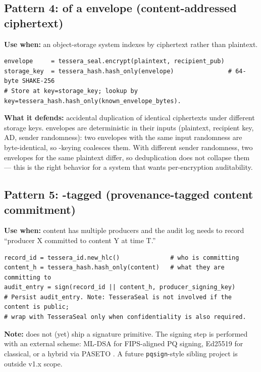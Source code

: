 \subsection{Pattern 4: \tesserahash{} of a \tesseraseal{} envelope (content-addressed ciphertext)}

\textbf{Use when:} an object-storage system indexes by ciphertext rather than plaintext.

\begin{lstlisting}[language=Pseudocode]
envelope     = tessera_seal.encrypt(plaintext, recipient_pub)
storage_key  = tessera_hash.hash_only(envelope)               # 64-byte SHAKE-256
# Store at key=storage_key; lookup by key=tessera_hash.hash_only(known_envelope_bytes).
\end{lstlisting}

\textbf{What it defends:} accidental duplication of identical ciphertexts under different storage keys. \tesseraseal{} envelopes are deterministic in their inputs (plaintext, recipient key, AD, sender randomness): two envelopes with the same input randomness are byte-identical, so \tesserahash{}-keying coalesces them. With different sender randomness, two envelopes for the same plaintext differ, so deduplication does not collapse them --- this is the right behavior for a system that wants per-encryption auditability.

\subsection{Pattern 5: \tesseraid{}-tagged \tesserahash{} (provenance-tagged content commitment)}

\textbf{Use when:} content has multiple producers and the audit log needs to record ``producer X committed to content Y at time T.''

\begin{lstlisting}[language=Pseudocode]
record_id = tessera_id.new_hlc()              # who is committing
content_h = tessera_hash.hash_only(content)   # what they are committing to
audit_entry = sign(record_id || content_h, producer_signing_key)
# Persist audit_entry. Note: TesseraSeal is not involved if the content is public;
# wrap with TesseraSeal only when confidentiality is also required.
\end{lstlisting}

\textbf{Note:} \tessera{} does not (yet) ship a signature primitive. The signing step is performed with an external scheme: ML-DSA \citep{fips204} for FIPS-aligned PQ signing, Ed25519 \citep{rfc8032} for classical, or a hybrid via PASETO \citep{paseto-v4}. A future \texttt{pqsign}-style sibling project is outside v1.x scope.

